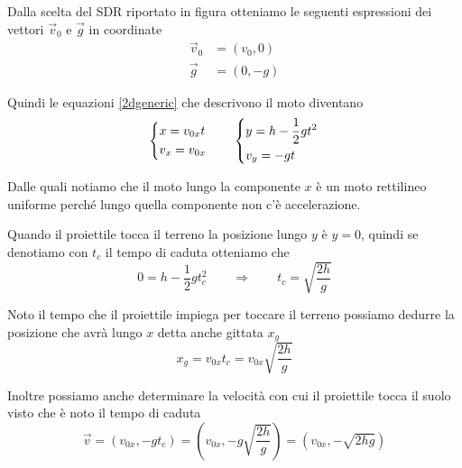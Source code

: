 \documentclass{article}
\begin{document}
Dalla scelta del SDR riportato in figura otteniamo le seguenti espressioni dei vettori $\Vec{v}_0$ e $\Vec{g}$ in coordinate
\begin{align}
  \Vec{v}_0 &= (v_0, 0)\\
  \Vec{g} &= (0, -g)
\end{align}

Quindi le equazioni \ref{2dgeneric} che descrivono il moto diventano
\begin{equation}
  \begin{dcases}
    x = v_{0x} t \\
    v_x = v_{0x}
  \end{dcases}
  \qquad
  \begin{dcases}
    y = h - \frac{1}{2}gt^2 \\
    v_y = - gt
  \end{dcases}
\end{equation}

Dalle quali notiamo che il moto lungo la componente $x$ è un moto rettilineo uniforme perché lungo quella componente non c'è accelerazione.

Quando il proiettile tocca il terreno la posizione lungo $y$ è $y=0$, quindi se denotiamo con $t_c$ il tempo di caduta otteniamo che
\begin{equation}
  0 = h - \frac{1}{2}gt_c^2 \qquad \Rightarrow \qquad t_c = \sqrt{\frac{2h}{g}}
\end{equation}

Noto il tempo che il proiettile impiega per toccare il terreno possiamo dedurre la posizione che avrà lungo $x$ detta anche gittata $x_g$
\begin{equation}
  x_g = v_{0x} t_c = v_{0x} \sqrt{\frac{2h}{g}}
\end{equation}

Inoltre possiamo anche determinare la velocità con cui il proiettile tocca il suolo visto che è noto il tempo di caduta
\begin{equation}
  \Vec{v} = (v_{0x}, -gt_c)
          = \left(v_{0x}, -g\sqrt{\frac{2h}{g}}\right)
          = (v_{0x}, -\sqrt{2hg})
\end{equation}
\end{document}
